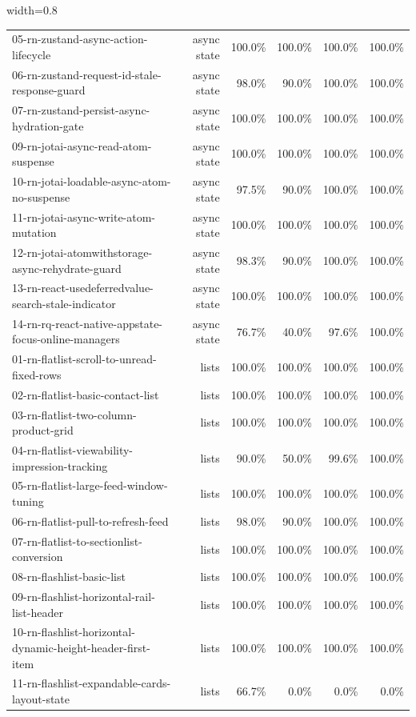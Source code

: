 \begin{table}[htbp]
\begin{adjustbox}{width=0.8\textwidth}
\begin{tabular}{lrrrrr}
05-rn-zustand-async-action-lifecycle & async state & 100.0\% & 100.0\% & 100.0\% & 100.0\% \\
06-rn-zustand-request-id-stale-response-guard & async state & 98.0\% & 90.0\% & 100.0\% & 100.0\% \\
07-rn-zustand-persist-async-hydration-gate & async state & 100.0\% & 100.0\% & 100.0\% & 100.0\% \\
09-rn-jotai-async-read-atom-suspense & async state & 100.0\% & 100.0\% & 100.0\% & 100.0\% \\
10-rn-jotai-loadable-async-atom-no-suspense & async state & 97.5\% & 90.0\% & 100.0\% & 100.0\% \\
11-rn-jotai-async-write-atom-mutation & async state & 100.0\% & 100.0\% & 100.0\% & 100.0\% \\
12-rn-jotai-atomwithstorage-async-rehydrate-guard & async state & 98.3\% & 90.0\% & 100.0\% & 100.0\% \\
13-rn-react-usedeferredvalue-search-stale-indicator & async state & 100.0\% & 100.0\% & 100.0\% & 100.0\% \\
14-rn-rq-react-native-appstate-focus-online-managers & async state & 76.7\% & 40.0\% & 97.6\% & 100.0\% \\
01-rn-flatlist-scroll-to-unread-fixed-rows & lists & 100.0\% & 100.0\% & 100.0\% & 100.0\% \\
02-rn-flatlist-basic-contact-list & lists & 100.0\% & 100.0\% & 100.0\% & 100.0\% \\
03-rn-flatlist-two-column-product-grid & lists & 100.0\% & 100.0\% & 100.0\% & 100.0\% \\
04-rn-flatlist-viewability-impression-tracking & lists & 90.0\% & 50.0\% & 99.6\% & 100.0\% \\
05-rn-flatlist-large-feed-window-tuning & lists & 100.0\% & 100.0\% & 100.0\% & 100.0\% \\
06-rn-flatlist-pull-to-refresh-feed & lists & 98.0\% & 90.0\% & 100.0\% & 100.0\% \\
07-rn-flatlist-to-sectionlist-conversion & lists & 100.0\% & 100.0\% & 100.0\% & 100.0\% \\
08-rn-flashlist-basic-list & lists & 100.0\% & 100.0\% & 100.0\% & 100.0\% \\
09-rn-flashlist-horizontal-rail-list-header & lists & 100.0\% & 100.0\% & 100.0\% & 100.0\% \\
10-rn-flashlist-horizontal-dynamic-height-header-first-item & lists & 100.0\% & 100.0\% & 100.0\% & 100.0\% \\
11-rn-flashlist-expandable-cards-layout-state & lists & 66.7\% & 0.0\% & 0.0\% & 0.0\% \\

\end{tabular}
\end{adjustbox}
\end{table}
